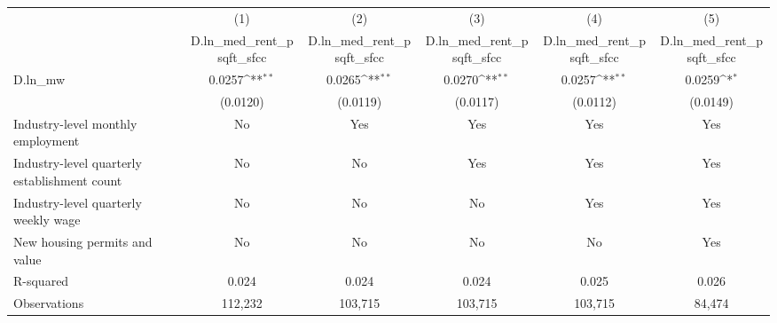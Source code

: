 {
\def\sym#1{\ifmmode^{#1}\else\(^{#1}\)\fi}
\begin{tabular}{l*{5}{c}}
\hline\hline
          &\multicolumn{1}{c}{(1)}&\multicolumn{1}{c}{(2)}&\multicolumn{1}{c}{(3)}&\multicolumn{1}{c}{(4)}&\multicolumn{1}{c}{(5)}\\
          &\multicolumn{1}{c}{D.ln\_med\_rent\_psqft\_sfcc}&\multicolumn{1}{c}{D.ln\_med\_rent\_psqft\_sfcc}&\multicolumn{1}{c}{D.ln\_med\_rent\_psqft\_sfcc}&\multicolumn{1}{c}{D.ln\_med\_rent\_psqft\_sfcc}&\multicolumn{1}{c}{D.ln\_med\_rent\_psqft\_sfcc}\\
\hline
D.ln\_mw   &   0.0257\sym{**} &   0.0265\sym{**} &   0.0270\sym{**} &   0.0257\sym{**} &   0.0259\sym{*}  \\
          & (0.0120)         & (0.0119)         & (0.0117)         & (0.0112)         & (0.0149)         \\
\hline
Industry-level monthly employment&       No         &      Yes         &      Yes         &      Yes         &      Yes         \\
Industry-level quarterly establishment count&       No         &       No         &      Yes         &      Yes         &      Yes         \\
Industry-level quarterly weekly wage&       No         &       No         &       No         &      Yes         &      Yes         \\
New housing permits and value&       No         &       No         &       No         &       No         &      Yes         \\
R-squared &    0.024         &    0.024         &    0.024         &    0.025         &    0.026         \\
Observations&  112,232         &  103,715         &  103,715         &  103,715         &   84,474         \\
\hline\hline
\end{tabular}
}
